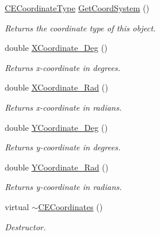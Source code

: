 \begin{DoxyCompactItemize}
\hyperlink{_c_e_coordinates_8h_a2198dc50406b64707964f5c1e8b32db2}{C\+E\+Coordinate\+Type} \hyperlink{class_c_e_coordinates_a3f86c747a99113c054fe4fc5408998ec}{Get\+Coord\+System} ()
\begin{DoxyCompactList}\small\item\em Returns the coordinate type of this object. \end{DoxyCompactList}\item 
double \hyperlink{class_c_e_coordinates_af395e512aa731b34bd98fa775c2cdec1}{X\+Coordinate\+\_\+\+Deg} ()
\begin{DoxyCompactList}\small\item\em Returns x-\/coordinate in degrees. \end{DoxyCompactList}\item 
double \hyperlink{class_c_e_coordinates_a7b5d9f29881522423dc22e791a2a0377}{X\+Coordinate\+\_\+\+Rad} ()
\begin{DoxyCompactList}\small\item\em Returns x-\/coordinate in radians. \end{DoxyCompactList}\item 
double \hyperlink{class_c_e_coordinates_a4e8bf7f64f1adcec562a29f02c6a1d15}{Y\+Coordinate\+\_\+\+Deg} ()
\begin{DoxyCompactList}\small\item\em Returns y-\/coordinate in degrees. \end{DoxyCompactList}\item 
double \hyperlink{class_c_e_coordinates_a58a9b0ac531278f3e2b25e9590e0169f}{Y\+Coordinate\+\_\+\+Rad} ()
\begin{DoxyCompactList}\small\item\em Returns y-\/coordinate in radians. \end{DoxyCompactList}\item 
virtual \hyperlink{class_c_e_coordinates_afa88db6b0ad40202d69eabfb219c134f}{$\sim$\+C\+E\+Coordinates} ()
\begin{DoxyCompactList}\small\item\em Destructor. \end{DoxyCompactList}\end{DoxyCompactItemize}
